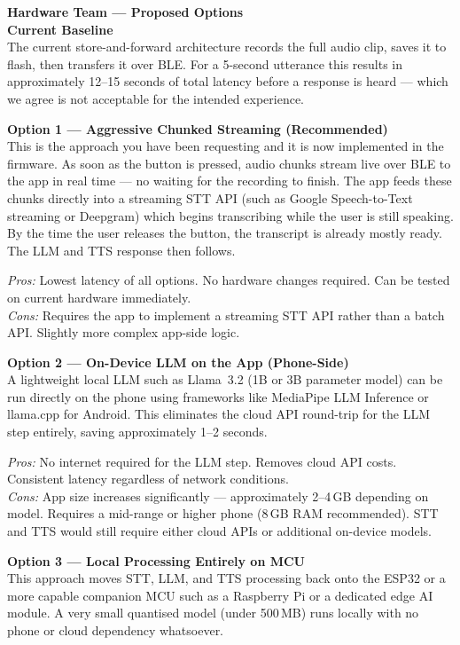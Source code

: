 \documentclass[12pt,a4paper]{article}
\begin{document}
\begin{hwbox}
\textbf{Hardware Team — Proposed Options}\\[8pt]

\textbf{Current Baseline}\\
The current store-and-forward architecture records the full audio clip, saves it to flash, then
transfers it over BLE. For a 5-second utterance this results in approximately 12--15 seconds of
total latency before a response is heard — which we agree is not acceptable for the intended
experience.

\bigskip
\textbf{Option 1 — Aggressive Chunked Streaming (Recommended)}\\
This is the approach you have been requesting and it is now implemented in the firmware. As soon
as the button is pressed, audio chunks stream live over BLE to the app in real time — no waiting
for the recording to finish. The app feeds these chunks directly into a streaming STT API (such
as Google Speech-to-Text streaming or Deepgram) which begins transcribing while the user is still
speaking. By the time the user releases the button, the transcript is already mostly ready. The
LLM and TTS response then follows.

\textit{Pros:} Lowest latency of all options. No hardware changes required. Can be tested on
current hardware immediately.\\
\textit{Cons:} Requires the app to implement a streaming STT API rather than a batch API.
Slightly more complex app-side logic.

\bigskip
\textbf{Option 2 — On-Device LLM on the App (Phone-Side)}\\
A lightweight local LLM such as Llama~3.2 (1B or 3B parameter model) can be run directly on the
phone using frameworks like MediaPipe LLM Inference or llama.cpp for Android. This eliminates
the cloud API round-trip for the LLM step entirely, saving approximately 1--2 seconds.

\textit{Pros:} No internet required for the LLM step. Removes cloud API costs. Consistent latency
regardless of network conditions.\\
\textit{Cons:} App size increases significantly — approximately 2--4\,GB depending on model.
Requires a mid-range or higher phone (8\,GB RAM recommended). STT and TTS would still require
either cloud APIs or additional on-device models.

\bigskip
\textbf{Option 3 — Local Processing Entirely on MCU}\\
This approach moves STT, LLM, and TTS processing back onto the ESP32 or a more capable companion
MCU such as a Raspberry Pi or a dedicated edge AI module. A very small quantised model (under
500\,MB) runs locally with no phone or cloud dependency whatsoever.


\end{hwbox}
\end{document}
